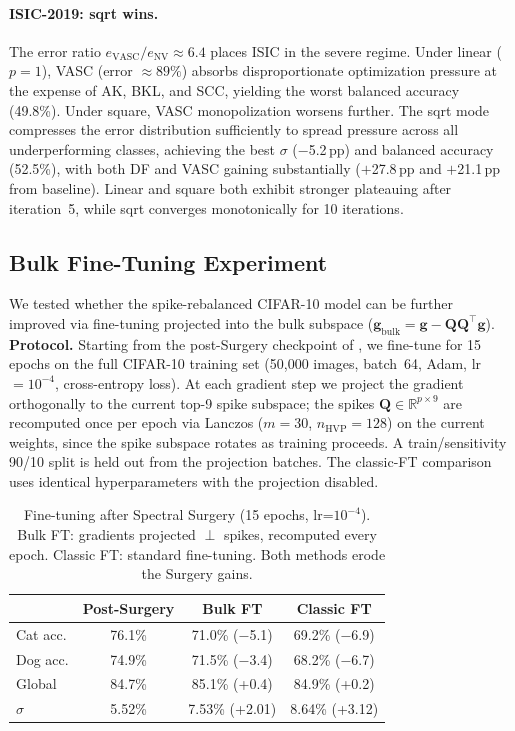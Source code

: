 \documentclass[11pt,a4paper]{article}
\newcommand{\R}{\mathbb{R}}
\newcommand{\mat}[1]{\bm{#1}}
\newcommand{\vect}[1]{\bm{#1}}
\begin{document}
\paragraph{ISIC-2019: sqrt wins.}
The error ratio $e_{\mathrm{VASC}}/e_{\mathrm{NV}} \approx 6.4$ places
ISIC in the severe regime. Under linear ($p=1$), VASC (error
$\approx 89\%$) absorbs disproportionate optimization pressure at the
expense of AK, BKL, and SCC, yielding the worst balanced accuracy
(49.8\%). Under square, VASC monopolization worsens further. The sqrt
mode compresses the error distribution sufficiently to spread pressure
across all underperforming classes, achieving the best $\sigma$
($-$5.2\,pp) and balanced accuracy (52.5\%), with both DF and VASC
gaining substantially ($+$27.8\,pp and $+$21.1\,pp from baseline).
Linear and square both exhibit stronger plateauing after iteration~5,
while sqrt converges monotonically for 10 iterations.

\subsection{Bulk Fine-Tuning Experiment}
\label{sec:bulk-ft}

We tested whether the spike-rebalanced CIFAR-10 model can be further
improved via fine-tuning projected into the bulk subspace
($\vect{g}_{\mathrm{bulk}} = \vect{g} -
\mat{Q}\mat{Q}^\top\vect{g}$). \textbf{Protocol.} Starting from the
post-Surgery checkpoint of , we fine-tune for
15 epochs on the full CIFAR-10 training set (50{,}000 images,
batch~64, Adam, lr~$=10^{-4}$, cross-entropy loss). At each gradient
step we project the gradient orthogonally to the current top-9 spike
subspace; the spikes $\mat{Q} \in \R^{p \times 9}$ are recomputed
once per epoch via Lanczos ($m{=}30$, $n_{\mathrm{HVP}}{=}128$) on the
current weights, since the spike subspace rotates as training proceeds.
A train/sensitivity 90/10 split is held out from the projection batches.
The classic-FT comparison uses identical hyperparameters with the
projection disabled.

\begin{table}[h]
\centering
\caption{Fine-tuning after Spectral Surgery (15 epochs, lr=$10^{-4}$).
Bulk FT: gradients projected $\perp$ spikes, recomputed every epoch.
Classic FT: standard fine-tuning. Both methods erode the Surgery gains.}
\label{tab:bulk-ft}
\begin{tabular}{lccc}
\toprule
 & Post-Surgery & Bulk FT & Classic FT \\
\midrule
Cat acc. & 76.1\% & 71.0\% ($-$5.1) & 69.2\% ($-$6.9) \\
Dog acc. & 74.9\% & 71.5\% ($-$3.4) & 68.2\% ($-$6.7) \\
Global & 84.7\% & 85.1\% (+0.4) & 84.9\% (+0.2) \\
$\sigma$ & 5.52\% & 7.53\% (+2.01) & 8.64\% (+3.12) \\
\bottomrule
\end{tabular}
\end{table}
\end{document}
